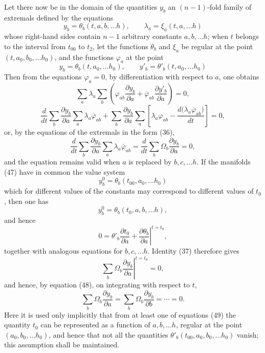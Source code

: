 \documentclass[11pt,a4paper,leqno]{article}
\begin{document}
Let there now be in the domain of the quantities $y_b$ an $(n-1)$-fold family of extremals defined by the equations
\begin{equation}\tag{47}
y_b=\theta_b(t,a,b,\ldots h),
\qquad
\lambda_a=\xi_a(t,a,\ldots h)
\end{equation}
whose right-hand sides contain $n-1$ arbitrary constants $a,b,\ldots h$; when $t$ belongs to the interval from $t_{00}$ to $t_2$, let the functions $\theta_b$ and $\xi_a$ be regular at the point $(t,a_0,b_0,\ldots h_0)$, and the functions $\varphi_a$ at the point
\[
y_b=\theta_b(t,a_0,\ldots h_0),
\qquad
y'_b=\theta'_b(t,a_0,\ldots h_0)
\]
Then from the equations $\varphi_a=0$, by differentiation with respect to $a$, one obtains
\[
\sum_a\lambda_a\sum_b
\left(
\varphi_{ab}\frac{\partial y_b}{\partial a}
+\overline{\varphi}_{ab}\frac{\partial y'_b}{\partial a}
\right)=0,
\]
\[
\frac{d}{dt}\sum_b\frac{\partial y_b}{\partial a}
\sum_a\lambda_a\overline{\varphi}_{ab}
+\sum_b\frac{\partial y_b}{\partial a}
\sum_a\left[
\lambda_a\varphi_{ab}-
\frac{d\bigl(\lambda_a\overline{\varphi}_{ab}\bigr)}{dt}
\right]=0,
\]
or, by the equations of the extremals in the form (36),
\begin{equation}\tag{48}
\frac{d}{dt}\sum_b\frac{\partial y_b}{\partial a}
\sum_a\lambda_a\overline{\varphi}_{ab}
=\frac{d}{dt}\sum_b\Omega_b\frac{\partial y_b}{\partial a}=0,
\end{equation}
and the equation remains valid when $a$ is replaced by $b,c,\ldots h$. If the manifolds (47) have in common the value system
\[
y_b^0=\theta_b(t_{00},a_0,\ldots h_0)
\]
which for different values of the constants may correspond to different values of $t_0$, then one has
\begin{equation}\tag{49}
y_b^0=\theta_b(t_0,a,b,\ldots h),
\end{equation}
and hence
\[
0=\theta'_b\frac{\partial t_0}{\partial a}
+\left.\frac{\partial\theta_b}{\partial a}\right|^{t=t_0},
\]
together with analogous equations for $b,c,\ldots h$. Identity (37) therefore gives
\[
\left.\sum_b\Omega_b\frac{\partial y_b}{\partial a}\right|^{t=t_0}=0,
\]
and hence, by equation (48), on integrating with respect to $t$,
\begin{equation}\tag{50}
\sum_b\Omega_b\frac{\partial y_b}{\partial a}
=\sum_b\Omega_b\frac{\partial y_b}{\partial b}=\cdots=0.
\end{equation}
Here it is used only implicitly that from at least one of equations (49) the quantity $t_0$ can be represented as a function of $a,b,\ldots h$, regular at the point $(a_0,b_0,\ldots h_0)$, and hence that not all the quantities $\theta'_b(t_{00},a_0,b_0,\ldots h_0)$ vanish; this assumption shall be maintained.
\end{document}
